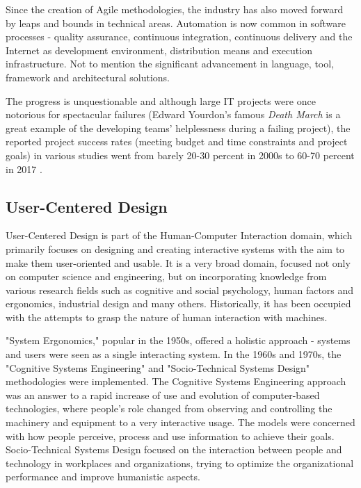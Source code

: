 \documentclass{article}
\begin{document}
Since the creation of Agile methodologies, the industry has also moved forward by leaps and bounds in technical areas. Automation is now common in software processes - quality assurance, continuous integration, continuous delivery and the Internet as development environment, distribution means and execution infrastructure. Not to mention the significant advancement in language, tool, framework and architectural solutions. \cite{fuggetta2014software}

The progress is unquestionable and although large IT projects were once notorious for spectacular failures (Edward Yourdon's famous \textit{Death March} \cite{yourdon1997death} is a great example of the developing teams' helplessness during a failing project), the reported project success rates (meeting budget and time constraints and project goals) in various studies went from barely 20-30 percent in 2000s \cite{kaur2013software} to 60-70 percent in 2017 \cite{pmi2017pulse}.

\subsection{User-Centered Design}
User-Centered Design is part of the Human-Computer Interaction domain, which primarily focuses on designing and creating interactive systems with the aim to make them user-oriented and usable. It is a very broad domain, focused not only on computer science and engineering, but on incorporating knowledge from various research fields such as cognitive and social psychology, human factors and ergonomics, industrial design and many others. Historically, it has been occupied with the attempts to grasp the nature of human interaction with machines. \cite{ritter2014user}

"System Ergonomics," popular in the 1950s, offered a holistic approach - systems and users were seen as a single interacting system. In the 1960s and 1970s, the "Cognitive Systems Engineering" and "Socio-Technical Systems Design" methodologies were implemented. The Cognitive Systems Engineering approach was an answer to a rapid increase of use and evolution of computer-based technologies, where people's role changed from observing and controlling the machinery and equipment to a very interactive usage. The models were concerned with how people perceive, process and use information to achieve their goals. Socio-Technical Systems Design focused on the interaction between people and technology in workplaces and organizations, trying to optimize the organizational performance and improve humanistic aspects.
\end{document}
